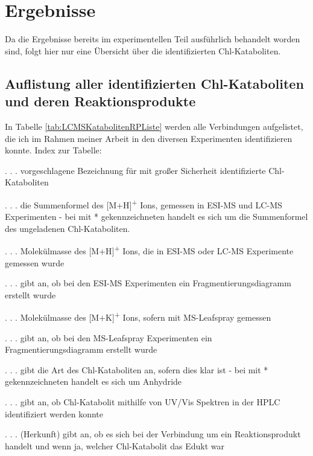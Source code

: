 \chapter{Ergebnisse}

Da die Ergebnisse bereits im experimentellen Teil ausführlich behandelt worden sind, folgt hier nur eine Übersicht über die identifizierten Chl-Kataboliten.

\section{Auflistung aller identifizierten Chl-Kataboliten und deren Reaktionsprodukte}

In Tabelle \ref{tab:LCMSKatabolitenRPListe} werden alle Verbindungen aufgelistet, die ich im Rahmen meiner Arbeit in den diversen Experimenten identifizieren konnte. Index zur Tabelle:

\begin{description}[align=right,labelwidth=3cm]
  \item [Chl-Katabolit] . . . vorgeschlagene Bezeichnung für mit großer Sicherheit identifizierte Chl-Kataboliten
  \item [Summenformel] . . . die Summenformel des [M+H]\textsuperscript{+} Ions, gemessen in ESI-MS und LC-MS Experimenten - bei mit * gekennzeichneten handelt es sich um die Summenformel des ungeladenen Chl-Kataboliten.
  \item [M+H] . . . Molekülmasse des [M+H]\textsuperscript{+} Ions, die in ESI-MS oder LC-MS Experimente gemessen wurde
  \item [Frag. I] . . . gibt an, ob bei den ESI-MS Experimenten ein Fragmentierungsdiagramm erstellt wurde
  \item [MS-Leafspray] . . . Molekülmasse des [M+K]\textsuperscript{+} Ions, sofern mit MS-Leafspray gemessen
  \item [Frag. II] . . . gibt an, ob bei den MS-Leafspray Experimenten ein Fragmentierungsdiagramm erstellt wurde
  \item [Typ] . . . gibt die Art des Chl-Kataboliten an, sofern dies klar ist - bei mit * gekennzeichneten handelt es sich um Anhydride
  \item [HPLC] . . . gibt an, ob Chl-Katabolit mithilfe von UV/Vis Spektren in der HPLC identifiziert werden konnte
  \item [H.] . . . (Herkunft) gibt an, ob es sich bei der Verbindung um ein Reaktionsprodukt handelt und wenn ja, welcher Chl-Katabolit das Edukt war
\end{description} 



